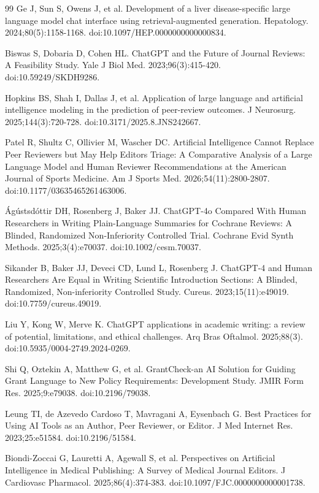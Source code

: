 \documentclass[11pt,a4paper]{article}
\begin{document}
\begin{thebibliography}{99}
 Ge J, Sun S, Owens J, et al. Development of a liver disease-specific large language model chat interface using retrieval-augmented generation. Hepatology. 2024;80(5):1158-1168. doi:10.1097/HEP.0000000000000834.

 Biswas S, Dobaria D, Cohen HL. ChatGPT and the Future of Journal Reviews: A Feasibility Study. Yale J Biol Med. 2023;96(3):415-420. doi:10.59249/SKDH9286.

 Hopkins BS, Shah I, Dallas J, et al. Application of large language and artificial intelligence modeling in the prediction of peer-review outcomes. J Neurosurg. 2025;144(3):720-728. doi:10.3171/2025.8.JNS242667.

 Patel R, Shultz C, Ollivier M, Wascher DC. Artificial Intelligence Cannot Replace Peer Reviewers but May Help Editors Triage: A Comparative Analysis of a Large Language Model and Human Reviewer Recommendations at the American Journal of Sports Medicine. Am J Sports Med. 2026;54(11):2800-2807. doi:10.1177/03635465261463006.

 Ágústsdóttir DH, Rosenberg J, Baker JJ. ChatGPT-4o Compared With Human Researchers in Writing Plain-Language Summaries for Cochrane Reviews: A Blinded, Randomized Non-Inferiority Controlled Trial. Cochrane Evid Synth Methods. 2025;3(4):e70037. doi:10.1002/cesm.70037.

 Sikander B, Baker JJ, Deveci CD, Lund L, Rosenberg J. ChatGPT-4 and Human Researchers Are Equal in Writing Scientific Introduction Sections: A Blinded, Randomized, Non-inferiority Controlled Study. Cureus. 2023;15(11):e49019. doi:10.7759/cureus.49019.

 Liu Y, Kong W, Merve K. ChatGPT applications in academic writing: a review of potential, limitations, and ethical challenges. Arq Bras Oftalmol. 2025;88(3). doi:10.5935/0004-2749.2024-0269.

 Shi Q, Oztekin A, Matthew G, et al. GrantCheck-an AI Solution for Guiding Grant Language to New Policy Requirements: Development Study. JMIR Form Res. 2025;9:e79038. doi:10.2196/79038.

 Leung TI, de Azevedo Cardoso T, Mavragani A, Eysenbach G. Best Practices for Using AI Tools as an Author, Peer Reviewer, or Editor. J Med Internet Res. 2023;25:e51584. doi:10.2196/51584.

 Biondi-Zoccai G, Lauretti A, Agewall S, et al. Perspectives on Artificial Intelligence in Medical Publishing: A Survey of Medical Journal Editors. J Cardiovasc Pharmacol. 2025;86(4):374-383. doi:10.1097/FJC.0000000000001738.


\end{thebibliography}
\end{document}
